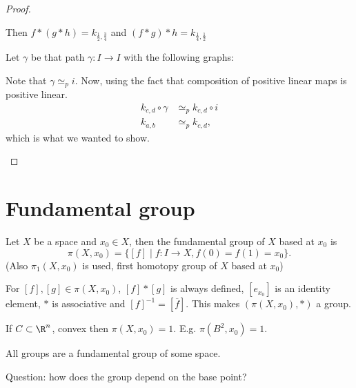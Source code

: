\begin{proof}
\begin{itemize}
            Then $f*(g*h) = k_{\frac{1}{2}, \frac{3}{4}}$ and $(f*g)*h = k_{\frac{1}{4}, \frac{1}{2}}$

            Let $\gamma$ be that path $\gamma:I \to  I$ with the following graphs:

            Note  that $\gamma \simeq_p i$.
            Now, using the fact that composition of positive linear maps is positive linear.
            \begin{align*}
                k_{c, d}  \circ  \gamma &\simeq_p  k_{c, d}  \circ i\\
                k_{a, b} &\simeq_p  k_{c, d},
            \end{align*} 
            which is what we wanted to show.
    \end{itemize}
\end{proof}


\section{Fundamental group}
\begin{definition}
    Let $X$ be a space and $x_0 \in X$, then the fundamental group of $X$ based at $x_0$ is
    \[
        \pi(X, x_0) = \{ [f]  \mid  f : I \to X, f(0) = f(1) = x_0\} 
    .\] 
    (Also $\pi_1(X, x_0)$ is used, first homotopy group of $X$ based at $x_0$)

    For $[f], [g] \in \pi(X, x_0)$, $[f] * [g]$ is always defined,  $[e_{x_0}]$ is an identity element, $*$ is associative and $[f]^{-1} = [\overline{f}]$. This makes $(\pi(X, x_0), *)$ a group.
\end{definition}
\begin{eg}
    If $C \subset \R^n$, convex then $\pi(X, x_0) = 1$.
    E.g. $\pi(B^2, x_0) = 1$.
\end{eg}

\begin{remark}
    All groups are a fundamental group of some space.
\end{remark}

Question: how does the group depend on  the base point?

